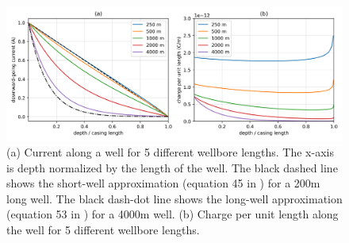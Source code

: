 \begin{figure}[htb]
    \begin{center}
    \includegraphics[width=\columnwidth]{figures/kaufman_finite_well.png}
    \end{center}
\caption{
    (a) Current along a well for 5 different wellbore lengths.
    The x-axis is depth normalized by the length of the well. The black
    dashed line shows the short-well approximation (equation 45 in \cite{Kaufman1993})
    for a 200m long well. The black dash-dot line shows the long-well approximation
    (equation 53 in \cite{Kaufman1993}) for a 4000m well.
    (b) Charge per unit length along the well for 5 different wellbore lengths.
}
\label{fig:kaufman_finite_well}
\end{figure}
